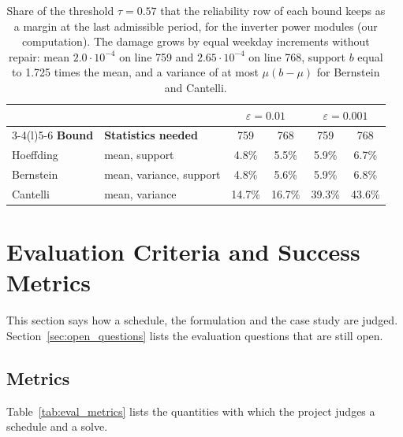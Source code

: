 \documentclass[11pt,a4paper]{article}
\theoremstyle{plain}
\theoremstyle{definition}
\theoremstyle{remark}
\begin{document}
\begin{table}[htbp]
\centering
\caption{Share of the threshold $\tau = 0.57$ that the reliability row of each bound keeps as a margin at the last admissible period, for the inverter power modules (our computation).
The damage grows by equal weekday increments without repair: mean $2.0 \cdot 10^{-4}$ on line 759 and $2.65 \cdot 10^{-4}$ on line 768, support $b$ equal to 1.725 times the mean, and a variance of at most $\mu(b-\mu)$ for Bernstein and Cantelli.}
\label{tab:cs_inv_bounds}
\small
\begin{tabular}{@{}llcccc@{}}
\toprule
\rowcolor{headgrey}
 & & \multicolumn{2}{c}{$\varepsilon = 0.01$} & \multicolumn{2}{c}{$\varepsilon = 0.001$} \\
\cmidrule(lr){3-4}\cmidrule(l){5-6}
\textbf{Bound} & \textbf{Statistics needed} & 759 & 768 & 759 & 768 \\
\midrule
Hoeffding & mean, support & 4.8\% & 5.5\% & 5.9\% & 6.7\% \\
Bernstein & mean, variance, support & 4.8\% & 5.6\% & 5.9\% & 6.8\% \\
Cantelli & mean, variance & 14.7\% & 16.7\% & 39.3\% & 43.6\% \\
\bottomrule
\end{tabular}
\end{table}

\section{Evaluation Criteria and Success Metrics}\label{sec:evaluation}

This section says how a schedule, the formulation and the case study are judged.
Section~\ref{sec:open_questions} lists the evaluation questions that are still open.

\subsection{Metrics}

Table~\ref{tab:eval_metrics} lists the quantities with which the project judges a schedule and a solve.
\end{document}
